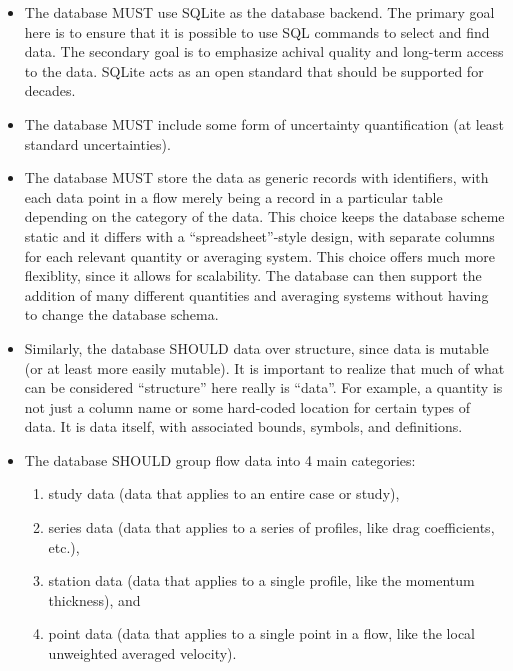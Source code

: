 \begin{itemize}

\item The database MUST use SQLite as the database backend.  The primary goal
here is to ensure that it is possible to use SQL commands to select and find
data.  The secondary goal is to emphasize achival quality and long-term access
to the data.  SQLite acts as an open standard that should be supported for
decades.

\item The database MUST include some form of uncertainty quantification (at
least standard uncertainties).

\item The database MUST store the data as generic records with identifiers,
with each data point in a flow merely being a record in a particular table
depending on the category of the data.  This choice keeps the database scheme
static and it differs with a ``spreadsheet''-style design, with separate
columns for each relevant quantity or averaging system.  This choice offers
much more flexiblity, since it allows for scalability.  The database can then
support the addition of many different quantities and averaging systems without
having to change the database schema.

\item Similarly, the database SHOULD data over structure, since data is mutable
(or at least more easily mutable).  It is important to realize that much of
what can be considered ``structure'' here really is ``data''.  For example, a
quantity is not just a column name or some hard-coded location for certain
types of data.  It is data itself, with associated bounds, symbols, and
definitions.

\item The database SHOULD group flow data into 4 main categories:

    \begin{enumerate}

    \item study data (data that applies to an entire case or study),

    \item series data (data that applies to a series of profiles, like drag
    coefficients, etc.),

    \item station data (data that applies to a single profile, like the
    momentum thickness), and

    \item point data (data that applies to a single point in a flow, like the
    local unweighted averaged velocity).


\end{enumerate}
\end{itemize}
